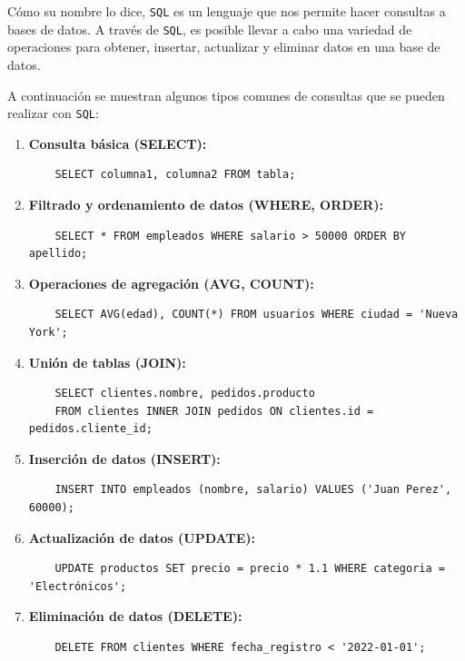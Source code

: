 Cómo su nombre lo dice, \texttt{SQL} es un lenguaje que nos permite hacer consultas a bases de datos.
A través de \texttt{SQL}, es posible llevar a cabo una variedad de operaciones para obtener, insertar, actualizar y eliminar datos en una base de datos. 

A continuación se muestran algunos tipos comunes de consultas que se pueden realizar con \texttt{SQL}:

\begin{enumerate}
    \item \textbf{Consulta básica (SELECT):}
    \begin{verbatim}
    SELECT columna1, columna2 FROM tabla;
    \end{verbatim}

    \item \textbf{Filtrado y ordenamiento de datos (WHERE, ORDER):}
    \begin{verbatim}
    SELECT * FROM empleados WHERE salario > 50000 ORDER BY apellido;
    \end{verbatim}

    \item \textbf{Operaciones de agregación (AVG, COUNT):}
    \begin{verbatim}
    SELECT AVG(edad), COUNT(*) FROM usuarios WHERE ciudad = 'Nueva York';
    \end{verbatim}

    \item \textbf{Unión de tablas (JOIN):}
    \begin{verbatim}
    SELECT clientes.nombre, pedidos.producto 
    FROM clientes INNER JOIN pedidos ON clientes.id = pedidos.cliente_id;
    \end{verbatim}

    \item \textbf{Inserción de datos (INSERT):}
    \begin{verbatim}
    INSERT INTO empleados (nombre, salario) VALUES ('Juan Perez', 60000);
    \end{verbatim}

    \item \textbf{Actualización de datos (UPDATE):}
    \begin{verbatim}
    UPDATE productos SET precio = precio * 1.1 WHERE categoria = 'Electrónicos';
    \end{verbatim}

    \item \textbf{Eliminación de datos (DELETE):}
    \begin{verbatim}
    DELETE FROM clientes WHERE fecha_registro < '2022-01-01';
    \end{verbatim}
\end{enumerate}

